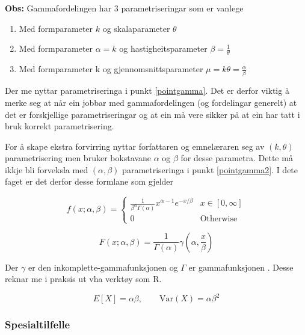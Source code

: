 \textbf{Obs: } Gammafordelingen har 3 parametriseringar som er vanlege

\begin{enumerate}
    \item Med formparameter $k$ og skalaparameter $\theta$ \label{pointgamma}
    \item Med formparameter $\alpha = k$ og hastigheitsparameter $\beta = \frac{1}{\theta}$ \label{pointgamma2}
    \item Med formparameter k og gjennomsnittsparameter $\mu = k\theta = \frac{\alpha}{\beta}$
\end{enumerate}

Der me nyttar parametriseringa i punkt \ref{pointgamma}. Det er derfor viktig å merke seg at når ein jobbar med gammafordelingen (og fordelingar generelt) at det er forskjellige parametriseringar og at ein må vere sikker på at ein har tatt i bruk korrekt parametrisering.

For å skape ekstra forvirring nyttar forfattaren og emnelæraren seg av $(k, \theta)$ parametrisering men bruker bokstavane $\alpha$ og $\beta$ for desse parametra. Dette må ikkje bli forveksla med $(\alpha, \beta)$ parametriseringa i punkt \ref{pointgamma2}. I dete faget er det derfor desse formlane som gjelder

\begin{equation}
    f(x; \alpha, \beta) = 
    \begin{cases}
        \frac{1}{\beta^\alpha \Gamma(\alpha)}x^{\alpha - 1}e^{-x/\beta} & x \in [0, \infty] \\
        0 & \text{Otherwise}
    \end{cases}
\end{equation}

\begin{equation}
    F(x; \alpha, \beta) = \frac{1}{\Gamma(\alpha)}\gamma\left(\alpha, \frac{x}{\beta}\right)
\end{equation}

Der $\gamma$ er den inkomplette-gammafunksjonen \cite{wiki:incomgamma} og $\Gamma$ er gammafunksjonen \cite{walpole2012probability}. Desse reknar me i praksis ut vha verktøy som R. 

\begin{equation}
    E[X] = \alpha\beta, \qquad \text{Var}(X) = \alpha\beta^2
\end{equation}

\subsubsection{Spesialtilfelle}

